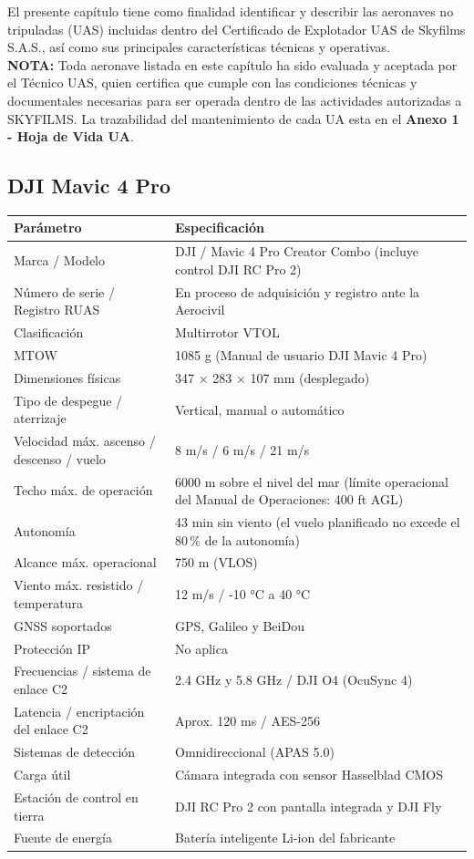 El presente capítulo tiene como finalidad identificar y describir las aeronaves no tripuladas (UAS) incluidas dentro del Certificado de Explotador UAS de Skyfilms S.A.S., así como sus principales características técnicas y operativas.\\

\textbf{NOTA:} Toda aeronave listada en este capítulo ha sido evaluada y aceptada por el Técnico UAS, quien certifica que cumple con las condiciones técnicas y documentales necesarias para ser operada dentro de las actividades autorizadas a SKYFILMS. La trazabilidad del mantenimiento de cada UA esta en el \textbf{Anexo 1 - Hoja de Vida UA}.

\subsection*{DJI Mavic 4 Pro}
\begin{longtable}{|p{5.2cm}|p{9.3cm}|}
\hline
\rowcolor{gray!30}\textbf{Parámetro} & \textbf{Especificación} \\ \hline
\endhead
Marca / Modelo & DJI / Mavic 4 Pro Creator Combo (incluye control DJI RC Pro 2) \\ \hline
Número de serie / Registro RUAS & En proceso de adquisición y registro ante la Aerocivil \\ \hline
Clasificación & Multirrotor VTOL \\ \hline
MTOW & 1085 g (Manual de usuario DJI Mavic 4 Pro) \\ \hline
Dimensiones físicas & 347 × 283 × 107 mm (desplegado) \\ \hline
Tipo de despegue / aterrizaje & Vertical, manual o automático \\ \hline
Velocidad máx. ascenso / descenso / vuelo & 8 m/s / 6 m/s / 21 m/s \\ \hline
Techo máx. de operación & 6000 m sobre el nivel del mar (límite operacional del Manual de Operaciones: 400 ft AGL) \\ \hline
Autonomía & 43 min sin viento (el vuelo planificado no excede el 80\,\% de la autonomía) \\ \hline
Alcance máx. operacional & 750 m (VLOS) \\ \hline
Viento máx. resistido / temperatura & 12 m/s / -10 °C a 40 °C \\ \hline
GNSS soportados & GPS, Galileo y BeiDou \\ \hline
Protección IP & No aplica \\ \hline
Frecuencias / sistema de enlace C2 & 2.4 GHz y 5.8 GHz / DJI O4 (OcuSync 4) \\ \hline
Latencia / encriptación del enlace C2 & Aprox. 120 ms / AES-256 \\ \hline
Sistemas de detección & Omnidireccional (APAS 5.0) \\ \hline
Carga útil & Cámara integrada con sensor Hasselblad CMOS \\ \hline
Estación de control en tierra & DJI RC Pro 2 con pantalla integrada y DJI Fly \\ \hline
Fuente de energía & Batería inteligente Li-ion del fabricante \\ \hline
\end{longtable}

